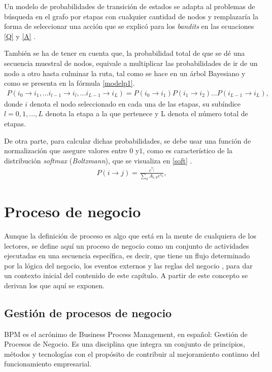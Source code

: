 Un modelo de probabilidades de transición de estados se adapta al problemas de búsqueda en el grafo por etapas con cualquier cantidad de nodos y remplazaría la forma de seleccionar una acción que se explicó para los \textit{bandits} en las ecuaciones \ref{Q} y \ref{A} \citep{sutton1998introduction}.

También se ha de tener en cuenta que, la probabilidad total de que se dé una secuencia muestral de nodos, equivale a multiplicar las probabilidades de ir de un nodo a otro hasta culminar la ruta, tal como se hace en un árbol Bayesiano y como se presenta en la fórmula \ref{modelp1}.
\begin{eqnarray}
\label{modelp1}
P(i_{0} \to i_{1}, ... i_{l-1} \to i_{l}, ... i_{L-1} \to i_{L})=P(i_{0} \to i_{1})P(i_{1} \to i_{2})...P(i_{L-1} \to i_{L}),
\end{eqnarray}
donde $i$ denota el nodo seleccionado en cada una de las etapas, su subíndice $l=0,1,...,L$ denota la etapa a la que pertenece y L denota el número total de etapas. 

De otra parte, para calcular dichas probabilidades, se debe usar una función de normalización que asegure valores entre $0$ y$1$, como es característico de la distribución \textit{softmax} (\textit{Boltzmann}), que se visualiza en \ref{soft} \citep{Softmax}.
\begin{eqnarray}
\label{soft}
P(i \to j) = \frac{e^{v_j}}{\sum_k A_{i,k} e^{v_k}},
\end{eqnarray}

\section{Proceso de negocio}

Aunque la definición de proceso es algo que está en la mente de cualquiera de los lectores, se define aquí un proceso de negocio como un conjunto de actividades ejecutadas en una secuencia específica, es decir, que tiene un flujo determinado por la lógica del negocio, los eventos externos y las reglas del negocio \citep{hitpass2017bpm}, para dar un contexto inicial del contenido de este capítulo. A partir de este concepto se derivan los que aquí se exponen.

\subsection{Gestión de procesos de negocio}

BPM es el acrónimo de Business Process Management, en español: Gestión de Procesos de Negocio. Es una disciplina que integra un conjunto de principios, métodos y tecnologías con el propósito de contribuir al mejoramiento continuo del funcionamiento empresarial.

